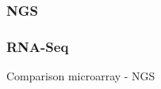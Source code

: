 \subsubsection{NGS}
\label{subsubsec:ngs}

\subsubsection{RNA-Seq}
\label{subsubsec:rnaseq}

Comparison microarray - NGS \parencite{richard2014comparison}

%
%
%
%
%
%
%
%
